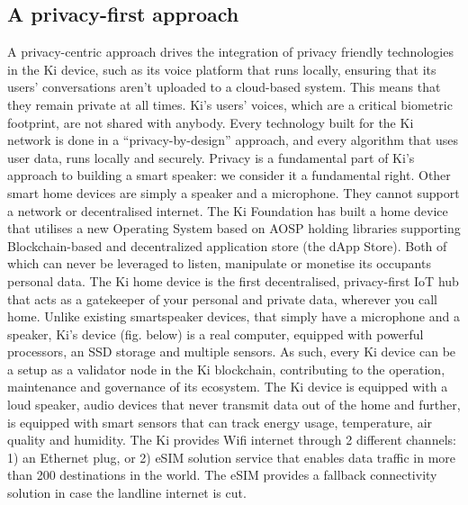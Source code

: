 \subsection{A privacy-first approach}
A privacy-centric approach drives the integration of privacy friendly technologies in the Ki device, such as its voice platform that runs locally, ensuring that its users’ conversations aren’t uploaded to a cloud-based system.  This means that they remain private at all times. Ki’s users’ voices, which are a critical biometric footprint, are not shared with anybody. 
Every technology built for the Ki network is done in a “privacy-by-design” approach, and every algorithm that uses user data, runs locally and securely. Privacy is a fundamental part of Ki’s approach to building a smart speaker: we consider it a fundamental right.
Other smart home devices are simply a speaker and a microphone. They cannot support a network or decentralised internet. The Ki Foundation has built a home device that utilises a new Operating System based on AOSP holding libraries supporting Blockchain-based and decentralized application store (the dApp Store). Both of which can never be leveraged to listen, manipulate or monetise its occupants personal data. The Ki home device is the first decentralised, privacy-first IoT hub that acts as a gatekeeper of your personal and private data, wherever you call home. Unlike existing smartspeaker devices, that simply have a microphone and a speaker, Ki’s device (fig. below) is a real computer, equipped with powerful processors, an SSD storage and multiple sensors. As such, every Ki device can be a setup as a validator node in the Ki blockchain, contributing to the operation, maintenance and governance of its ecosystem. The Ki device is equipped with a loud speaker, audio devices that never transmit data out of the home and further, is equipped with smart sensors that can track energy usage, temperature, air quality and humidity. The Ki provides Wifi internet through 2 different channels: 1)  an Ethernet plug, or 2) eSIM solution service that enables data traffic in more than 200 destinations in the world. The eSIM provides a fallback connectivity solution in case the landline internet is cut.

